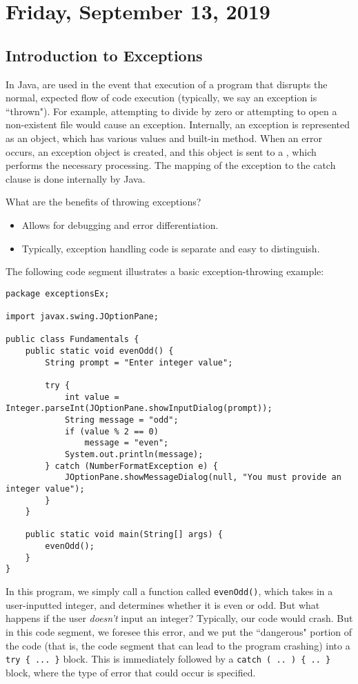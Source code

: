 \section{Friday, September 13, 2019}
\subsection{Introduction to Exceptions}
In Java,  are used in the event that execution of a program that disrupts the normal, expected flow of code execution (typically, we say an exception is ``thrown"). For example, attempting to divide by zero or attempting to open a non-existent file would cause an exception. Internally, an exception is represented as an object, which has various values and built-in method. When an error occurs, an exception object is created, and this object is sent to a , which performs the necessary processing. The mapping of the exception to the catch clause is done internally by Java.


What are the benefits of throwing exceptions?
\begin{itemize}
    \item Allows for debugging and error differentiation.
    \item Typically, exception handling code is separate and easy to distinguish. 
\end{itemize}

The following code segment illustrates a basic exception-throwing example:

\begin{lstlisting}
package exceptionsEx;

import javax.swing.JOptionPane;

public class Fundamentals {
	public static void evenOdd() {
		String prompt = "Enter integer value";
		
		try {
			int value = Integer.parseInt(JOptionPane.showInputDialog(prompt));
			String message = "odd";
			if (value % 2 == 0)
				message = "even";
			System.out.println(message);
		} catch (NumberFormatException e) {
			JOptionPane.showMessageDialog(null, "You must provide an integer value");
		}
	}

	public static void main(String[] args) {
		evenOdd();
	}
}
\end{lstlisting}

In this program, we simply call a function called \verb!evenOdd()!, which takes in a user-inputted integer, and determines whether it is even or odd. But what happens if the user \textit{doesn't} input an integer? Typically, our code would crash. But in this code segment, we foresee this error, and we put the ``dangerous" portion of the code (that is, the code segment that can lead to the program crashing) into a \verb!try { ... }! block. This is immediately followed by a \verb!catch ( .. ) { .. }! block, where the type of error that could occur is specified.

